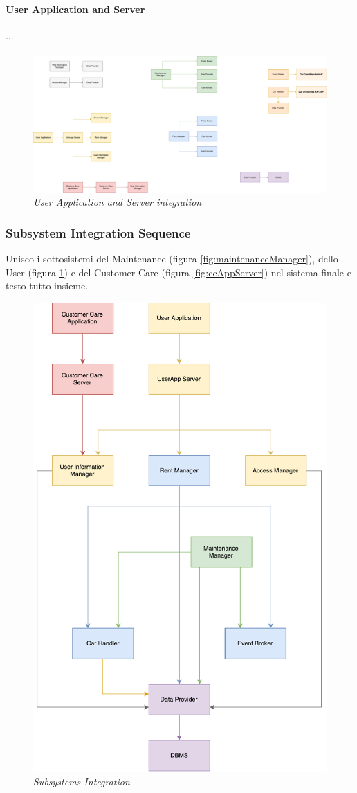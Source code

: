 \paragraph{User Application and Server} 
...
\paragraph{}
		
		\begin{figure}[h]
			\centering
			\includegraphics[width=0.8\linewidth]{img/Integration4}
			\caption{
				\label{fig:userAppServer} 
				\emph{User Application and Server integration}
			}
		\end{figure}

\clearpage 

\subsubsection{Subsystem Integration Sequence}

Unisco i sottosistemi del Maintenance (figura \ref{fig:maintenanceManager}), dello User (figura \ref{fig:userAppServer})  e del Customer Care (figura \ref{fig:ccAppServer}) nel sistema finale e testo tutto insieme. 

	\begin{figure}[h]
			\centering
			\includegraphics[width=0.8\linewidth]{img/subsystemIntegration}
			\caption{
				\label{fig:subsystemIntegration} 
				\emph{Subsystems Integration}
			}
		\end{figure}
